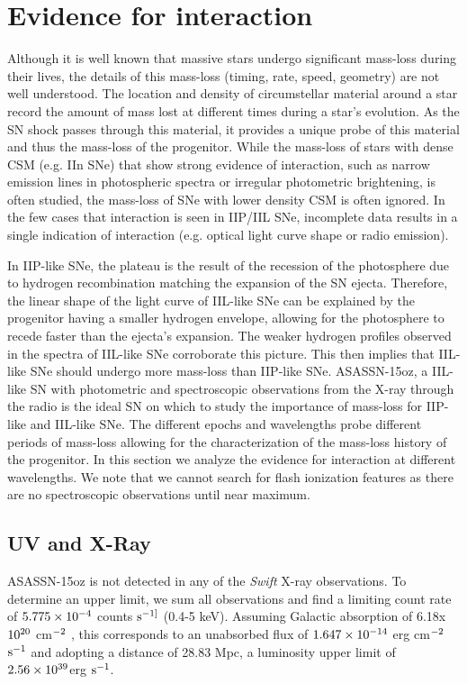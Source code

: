 \documentclass[a4paper,fleqn,usenatbib]{mnras}
\begin{document}
\section{Evidence for interaction} \label{sec:Interaction}
Although it is well known that massive stars undergo significant mass-loss during their lives, the details of this mass-loss (timing, rate, speed, geometry) are not well understood.
The location and density of circumstellar material around a star record the amount of mass lost at different times during a star's evolution. 
As the SN shock passes through this material, it provides a unique probe of this material and thus the mass-loss of the progenitor.
While the mass-loss of stars with dense CSM (e.g. IIn SNe) that show strong evidence of interaction, such as narrow emission lines in photospheric spectra or irregular photometric brightening, is often studied, the mass-loss of SNe with lower density CSM is often ignored.
In the few cases that interaction is seen in IIP/IIL SNe, incomplete data results in a single indication of interaction (e.g. optical light curve shape or radio emission).

In IIP-like SNe, the plateau is the result of the recession of the photosphere due to hydrogen recombination matching the expansion of the SN ejecta.
Therefore, the linear shape of the light curve of IIL-like SNe can be explained by the progenitor having a smaller hydrogen envelope, allowing for the photosphere to recede faster than the ejecta's expansion.
The weaker hydrogen profiles observed in the spectra of IIL-like SNe corroborate this picture.
This then implies that IIL-like SNe should undergo more mass-loss than IIP-like SNe.
ASASSN-15oz, a IIL-like SN with photometric and spectroscopic observations from the X-ray through the radio is the ideal SN on which to study the importance of mass-loss for IIP-like and IIL-like SNe.
The different epochs and wavelengths probe different periods of mass-loss allowing for the characterization of the mass-loss history of the progenitor.
In this section we analyze the evidence for interaction at different wavelengths.
We note that we cannot search for flash ionization features as there are no spectroscopic observations until near maximum.
\subsection{UV and X-Ray}
ASASSN-15oz is not detected in any of the \textit{Swift} X-ray observations. 
To determine an upper limit, we sum all observations and find a limiting count rate of  $\rm{5.775\times10^{-4}}$ counts $\rm{s^{-1]}}$ (0.4-5 keV).
Assuming Galactic absorption of 6.18x$\rm{10^{20}}$ cm$\rm{^{-2}}$ \citep{2005kalberla}, this corresponds to an unabsorbed flux of $\rm{1.647\times10^{-14}}$ erg cm$\rm{^{-2}}$ $\rm{s^{-1}}$ and adopting a distance of 28.83 Mpc, a luminosity upper limit of $\rm{2.56 \times10^{39}}$erg $\rm{s^{-1}}$.
\end{document}
